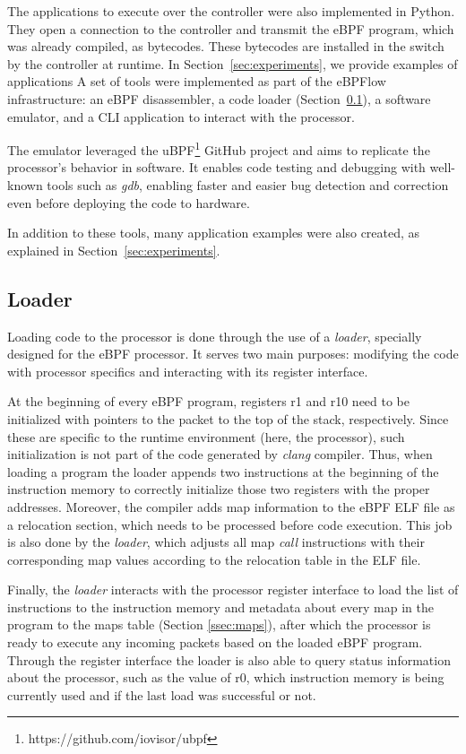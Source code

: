 The applications to execute over the controller were also implemented in Python.
They open a connection to the controller and transmit the eBPF program, which was already compiled, as bytecodes.
These bytecodes are installed in the switch by the controller at runtime.
In Section~\ref{sec:experiments}, we provide examples of applications
\color{black}
\color{blue}
A set of tools were implemented as part of the eBPFlow infrastructure: an eBPF disassembler, a code loader (Section~\ref{ssec:loader}), a software emulator, and a CLI application to interact with the processor.

The emulator leveraged the uBPF\footnote{https://github.com/iovisor/ubpf} GitHub project and aims to replicate the processor's behavior in software. It enables code testing and debugging with well-known tools such as \textit{gdb}, enabling faster and easier bug detection and correction even before deploying the code to hardware.

In addition to these tools, many application examples were also created, as explained in Section~\ref{sec:experiments}.

\subsection{Loader}
\label{ssec:loader}
Loading code to the processor is done through the use of a \textit{loader}, specially designed for the eBPF processor. It serves two main purposes: modifying the code with processor specifics and interacting with its register interface.

At the beginning of every eBPF program, registers r1 and r10 need to be initialized with pointers to the packet to the top of the stack, respectively. Since these are specific to the runtime environment (here, the processor), such initialization is not part of the code generated by \textit{clang} compiler. Thus, when loading a program the loader appends two instructions at the beginning of the instruction memory to correctly initialize those two registers with the proper addresses. Moreover, the compiler adds map information to the eBPF ELF file as a relocation section, which needs to be processed before code execution. This job is also done by the \textit{loader}, which adjusts all map \textit{call} instructions with their corresponding map values according to the relocation table in the ELF file.

Finally, the \textit{loader} interacts with the processor register interface to load the list of instructions to the instruction memory and metadata about every map in the program to the maps table (Section \ref{ssec:maps}), after which the processor is ready to execute any incoming packets based on the loaded eBPF program. Through the register interface the loader is also able to query status information about the processor, such as the value of r0, which instruction memory is being currently used and if the last load was successful or not.

\color{black}